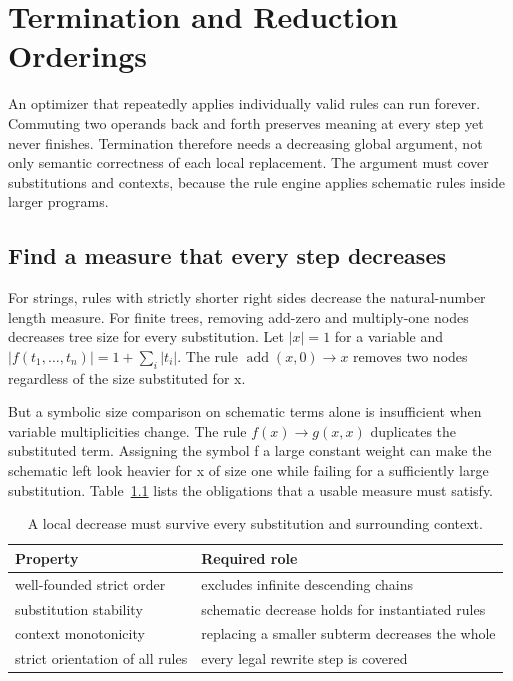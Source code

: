 \chapter{Termination and Reduction Orderings}
\label{ch:rewrite-termination}

An optimizer that repeatedly applies individually valid rules can run forever.
Commuting two operands back and forth preserves meaning at every step yet never finishes.
Termination therefore needs a decreasing global argument, not only semantic correctness of each local replacement.
The argument must cover substitutions and contexts, because the rule engine applies schematic rules inside larger programs.

\section{Find a measure that every step decreases}
\label{sec:ch83-measure}
For strings, rules with strictly shorter right sides decrease the natural-number length measure.
For finite trees, removing add-zero and multiply-one nodes decreases tree size for every substitution.
Let $|x|=1$ for a variable and $|f(t_1,\ldots,t_n)|=1+\sum_i|t_i|$.
The rule $\operatorname{add}(x,0)\to x$ removes two nodes regardless of the size substituted for x.

But a symbolic size comparison on schematic terms alone is insufficient when variable multiplicities change.
The rule $f(x)\to g(x,x)$ duplicates the substituted term.
Assigning the symbol f a large constant weight can make the schematic left look heavier for x of size one while failing for a sufficiently large substitution.
Table~\ref{tab:ch83-measures} lists the obligations that a usable measure must satisfy.

\begin{table}[htbp]
\caption{A local decrease must survive every substitution and surrounding context.}
\label{tab:ch83-measures}
\centering
\begin{tabular}{ll}
\toprule
Property & Required role \\
\midrule
well-founded strict order & excludes infinite descending chains \\
substitution stability & schematic decrease holds for instantiated rules \\
context monotonicity & replacing a smaller subterm decreases the whole \\
strict orientation of all rules & every legal rewrite step is covered \\
\bottomrule
\end{tabular}
\end{table}


